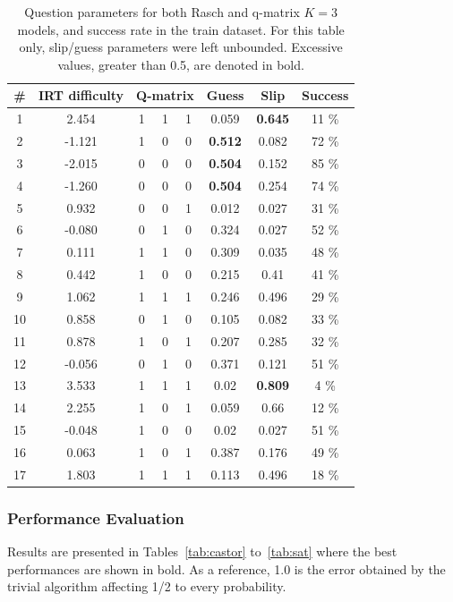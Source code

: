 \documentclass{edm_template}
\begin{document}
\begin{table}
\small\centering\begin{tabular}{c|c|ccccc|c}
\# & IRT difficulty & 	\multicolumn{3}{c}{Q-matrix} & Guess & Slip & Success\\
\hline
1 & 2.454 & 	1 & 1 & 1 & 0.059 & \textbf{0.645} & 11 \% \\
2 & -1.121 & 	1 & 0 & 0 & \textbf{0.512} & 0.082 & 72 \% \\
3 & -2.015 & 	0 & 0 & 0 & \textbf{0.504} & 0.152 & 85 \% \\
4 & -1.260 & 	0 & 0 & 0 & \textbf{0.504} & 0.254 & 74 \% \\
5 & 0.932 & 	0 & 0 & 1 & 0.012 & 0.027 & 31 \% \\
6 & -0.080 & 	0 & 1 & 0 & 0.324 & 0.027 & 52 \% \\
7 & 0.111 & 	1 & 1 & 0 & 0.309 & 0.035 & 48 \% \\
8 & 0.442 & 	1 & 0 & 0 & 0.215 & 0.41 & 41 \% \\
9 & 1.062 & 	1 & 1 & 1 & 0.246 & 0.496 & 29 \% \\
10 & 0.858 & 	0 & 1 & 0 & 0.105 & 0.082 & 33 \% \\
11 & 0.878 & 	1 & 0 & 1 & 0.207 & 0.285 & 32 \% \\
12 & -0.056 & 	0 & 1 & 0 & 0.371 & 0.121 & 51 \% \\
13 & 3.533 & 	1 & 1 & 1 & 0.02 & \textbf{0.809} & 4 \% \\
14 & 2.255 & 	1 & 0 & 1 & 0.059 & 0.66 & 12 \% \\
15 & -0.048 & 	1 & 0 & 0 & 0.02 & 0.027 & 51 \% \\
16 & 0.063 & 	1 & 0 & 1 & 0.387 & 0.176 & 49 \% \\
17 & 1.803 & 	1 & 1 & 1 & 0.113 & 0.496 & 18 \%
\end{tabular}
\caption{Question parameters for both Rasch and q-matrix $K = 3$ models, and success rate in the train dataset. For this table only, slip/guess parameters were left unbounded. Excessive values, greater than 0.5, are denoted in bold.}
\label{tab:example}
\end{table}

\subsubsection{Performance Evaluation}

Results are presented in Tables~\ref{tab:castor} to~\ref{tab:sat} where the best performances are shown in bold. As a reference, 1.0 is the error obtained by the trivial algorithm affecting 1/2 to every probability. %
\end{document}
